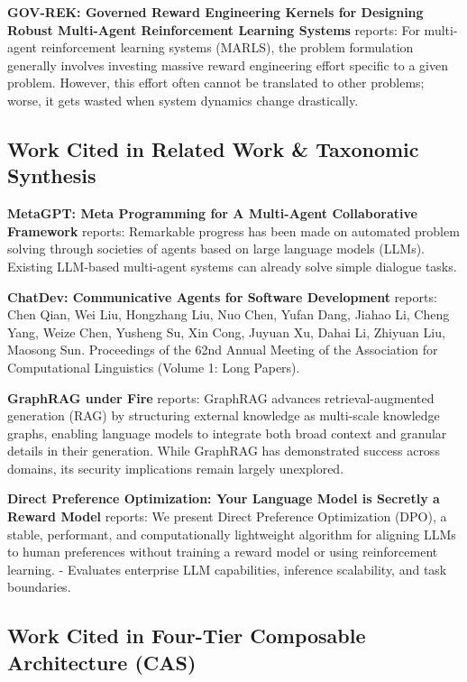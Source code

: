 \documentclass[10pt,journal,compsoc,twocolumn]{IEEEtran}
\begin{document}
\textbf{GOV-REK: Governed Reward Engineering Kernels for Designing Robust Multi-Agent Reinforcement Learning Systems} \cite{arxiv_2404_01131} reports: For multi-agent reinforcement learning systems (MARLS), the problem formulation generally involves investing massive reward engineering effort specific to a given problem. However, this effort often cannot be translated to other problems; worse, it gets wasted when system dynamics change drastically.


\subsection{Work Cited in Related Work \& Taxonomic Synthesis}


\textbf{MetaGPT: Meta Programming for A Multi-Agent Collaborative Framework} \cite{crossref_10_48550_arxiv_2308_00352} reports: Remarkable progress has been made on automated problem solving through societies of agents based on large language models (LLMs). Existing LLM-based multi-agent systems can already solve simple dialogue tasks.

\textbf{ChatDev: Communicative Agents for Software Development} \cite{crossref_10_18653_v1_2024_acl_long_810} reports: Chen Qian, Wei Liu, Hongzhang Liu, Nuo Chen, Yufan Dang, Jiahao Li, Cheng Yang, Weize Chen, Yusheng Su, Xin Cong, Juyuan Xu, Dahai Li, Zhiyuan Liu, Maosong Sun. Proceedings of the 62nd Annual Meeting of the Association for Computational Linguistics (Volume 1: Long Papers).

\textbf{GraphRAG under Fire} \cite{arxiv_2501_14050} reports: GraphRAG advances retrieval-augmented generation (RAG) by structuring external knowledge as multi-scale knowledge graphs, enabling language models to integrate both broad context and granular details in their generation. While GraphRAG has demonstrated success across domains, its security implications remain largely unexplored.

\textbf{Direct Preference Optimization: Your Language Model is Secretly a Reward Model} \cite{arxiv_2305_18290} reports: We present Direct Preference Optimization (DPO), a stable, performant, and computationally lightweight algorithm for aligning LLMs to human preferences without training a reward model or using reinforcement learning. - Evaluates enterprise LLM capabilities, inference scalability, and task boundaries.


\subsection{Work Cited in Four-Tier Composable Architecture (CAS)}
\end{document}
